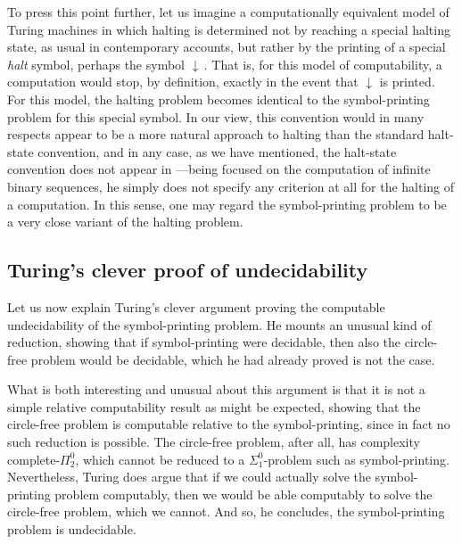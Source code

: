 \documentclass[12pt]{amsart}
\begin{document}
\newcommand\halt{\boldsymbol{\downarrow}}
To press this point further, let us imagine a computationally equivalent model of Turing machines in which halting is determined not by reaching a special halting state, as usual in contemporary accounts, but rather by the printing of a special \emph{halt} symbol, perhaps the symbol $\halt$\,. That is, for this model of computability, a computation would stop, by definition, exactly in the event that $\halt$ is printed. For this model, the halting problem becomes identical to the symbol-printing problem for this special symbol. In our view, this convention would in many respects appear to be a more natural approach to halting than the standard halt-state convention, and in any case, as we have mentioned, the halt-state convention does not appear in \cite{Turing1936:On-computable-numbers}---being focused on the computation of infinite binary sequences, he simply does not specify any criterion at all for the halting of a computation. In this sense, one may regard the symbol-printing problem to be a very close variant of the halting problem. 

\subsection{Turing's clever proof of undecidability}

Let us now explain Turing's clever argument proving the computable undecidability of the symbol-printing problem. He mounts an unusual kind of reduction, showing that if symbol-printing were decidable, then also the circle-free problem would be decidable, which he had already proved is not the case. 

What is both interesting and unusual about this argument is that it is not a simple relative computability result as might be expected, showing that the circle-free problem is computable relative to the symbol-printing, since in fact no such reduction is possible. The circle-free problem, after all, has complexity complete-$\Pi^0_2$, which cannot be reduced to a $\Sigma^0_1$-problem such as symbol-printing. Nevertheless, Turing does argue that if we could actually solve the symbol-printing problem computably, then we would be able computably to solve the circle-free problem, which we cannot. And so, he concludes, the symbol-printing problem is undecidable. 
\end{document}
